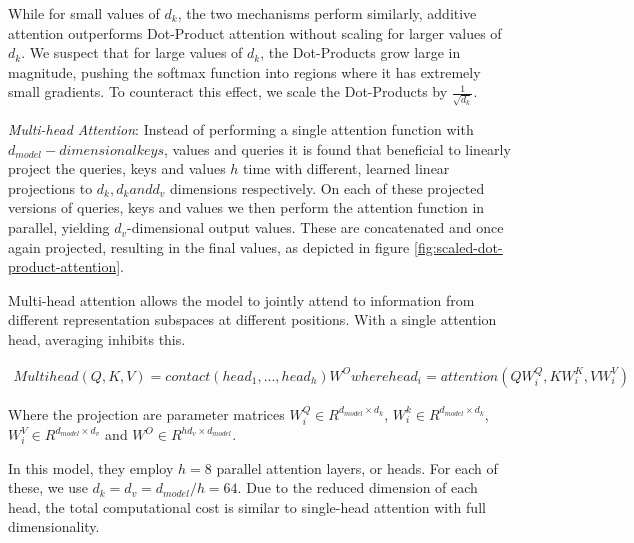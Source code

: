 \documentclass{report}
\begin{document}
While for small values of $d_k$, the two mechanisms perform similarly, additive attention outperforms Dot-Product attention without scaling for larger values of $d_k$. We suspect that for large values of $d_k$, the Dot-Products grow large in magnitude, pushing the softmax function into regions where it has extremely small gradients. To counteract this effect, we scale the Dot-Products by $\frac{1}{\sqrt{d_k}}$.

\textit{Multi-head Attention}:
Instead of performing a single attention function with $d_{model}-dimensional keys$, values and queries it is found that beneficial to linearly project the queries, keys and values $h$ time with different, learned linear projections to $d_k, d_k and d_v$ dimensions respectively. On each of these projected versions of queries, keys and values we then perform the attention function in parallel, yielding $d_v$-dimensional output values. These are concatenated and once again projected, resulting in the final values, as depicted in figure \ref{fig:scaled-dot-product-attention}.

Multi-head attention allows the model to jointly attend to information from different representation subspaces at different positions. With a single attention head, averaging inhibits this.

\begin{equation*}
	\begin{aligned}
	Multihead(Q, K, V)=contact(head_1,...,head_h)W^O
	where head_i=attention(Q W_i^Q, K W_i^K, V W_i^V)
\end{aligned}
\end{equation*}

Where the projection are parameter matrices $W_i^Q \in R^{d_{model} \times d_k}$, $W_i^k \in R^{d_{model} \times d_k}$, $W_i^V \in R^{d_{model} \times d_v}$ and $W^O \in R^{h d_v \times d_{model}}$.

In this model, they employ $h=8$ parallel attention layers, or heads. For each of these, we use $d_k=d_v=d_{model}/h=64$. Due to the reduced dimension of each head, the total computational cost is similar to single-head attention with full dimensionality.
\end{document}
